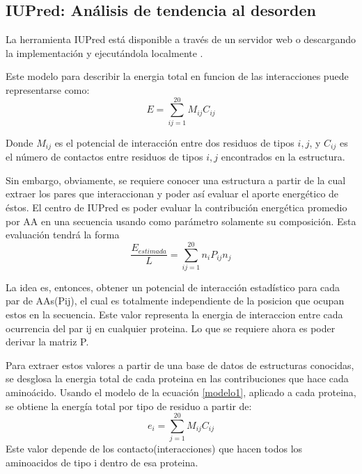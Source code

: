 \subsection{IUPred: Análisis de tendencia al desorden} \label{iupred}

La herramienta IUPred\cite{dosztanyi2005pairwise} está disponible a través de un servidor web \cite{iupredWeb,dosztanyi2005iupred} o descargando la implementación y ejecutándola localmente \cite{iupredDownload}.   



Este modelo para describir la energia total en funcion de las interacciones puede representarse como:
\begin{equation}\label{modelo1}
E = \sum_{ij=1}^{20} M_{ij}C_{ij}
\end{equation}

Donde $M_{ij}$ es el potencial de interacción entre dos residuos de tipos $i,j$, y $C_{ij}$ es el número de contactos entre residuos de tipos $i,j$ encontrados en la estructura.

Sin embargo, obviamente, se requiere conocer una estructura a partir de la cual extraer los pares que interaccionan y poder así evaluar el aporte energético de éstos.
El centro de IUPred es poder evaluar la contribución energética promedio por AA en una secuencia usando como parámetro solamente su composición.
Esta evaluación tendrá la forma
\begin{equation}\label{modelo2}
\frac{E_{estimada}}{L} = \sum_{ij=1}^{20} n_{i}P_{ij}n_{j}
\end{equation}

La idea es, entonces, obtener un potencial de interacción estadístico para cada par de AAs(Pij), el cual es totalmente independiente de la posicion que ocupan estos en la secuencia.
Este valor representa la energia de interaccion entre cada ocurrencia del par ij en cualquier proteina.
Lo que se requiere ahora es poder derivar la matriz P.

Para extraer estos valores a partir de una base de datos de estructuras conocidas, se desglosa la energia total de cada proteina en las contribuciones que hace cada aminoácido.
Usando el modelo de la ecuación \ref{modelo1}, aplicado a cada proteina, se obtiene la energía total por tipo de residuo a partir de:
\begin{equation}\label{ek1}
  e_i = \sum_{j=1}^{20} M_{ij}C_{ij}
\end{equation}
Este valor depende de los contacto(interacciones) que hacen todos los aminoacidos de tipo i dentro de esa proteina. 

